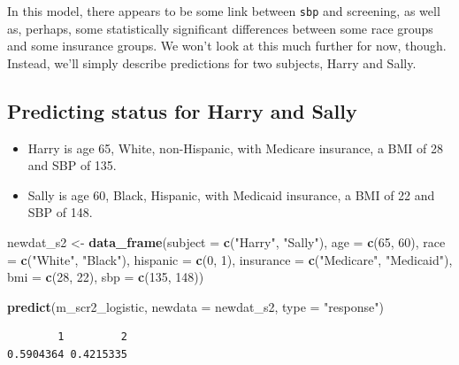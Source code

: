 \documentclass[]{book}
\newenvironment{Shaded}{\begin{snugshade}}{\end{snugshade}}
\newcommand{\KeywordTok}[1]{\textcolor[rgb]{0.13,0.29,0.53}{\textbf{#1}}}
\newcommand{\DataTypeTok}[1]{\textcolor[rgb]{0.13,0.29,0.53}{#1}}
\newcommand{\DecValTok}[1]{\textcolor[rgb]{0.00,0.00,0.81}{#1}}
\newcommand{\StringTok}[1]{\textcolor[rgb]{0.31,0.60,0.02}{#1}}
\newcommand{\NormalTok}[1]{#1}
\providecommand{\tightlist}{%
  \setlength{\itemsep}{0pt}\setlength{\parskip}{0pt}}
\theoremstyle{definition}
\theoremstyle{definition}
\theoremstyle{definition}
\theoremstyle{remark}
\begin{document}
In this model, there appears to be some link between \texttt{sbp} and
screening, as well as, perhaps, some statistically significant
differences between some race groups and some insurance groups. We won't
look at this much further for now, though. Instead, we'll simply
describe predictions for two subjects, Harry and Sally.

\subsection{Predicting status for Harry and
Sally}\label{predicting-status-for-harry-and-sally}

\begin{itemize}
\tightlist
\item
  Harry is age 65, White, non-Hispanic, with Medicare insurance, a BMI
  of 28 and SBP of 135.
\item
  Sally is age 60, Black, Hispanic, with Medicaid insurance, a BMI of 22
  and SBP of 148.
\end{itemize}

\begin{Shaded}
\begin{Highlighting}[]
\NormalTok{newdat_s2 <-}\StringTok{ }\KeywordTok{data_frame}\NormalTok{(}\DataTypeTok{subject =} \KeywordTok{c}\NormalTok{(}\StringTok{"Harry"}\NormalTok{, }\StringTok{"Sally"}\NormalTok{),}
                     \DataTypeTok{age =} \KeywordTok{c}\NormalTok{(}\DecValTok{65}\NormalTok{, }\DecValTok{60}\NormalTok{),}
                     \DataTypeTok{race =} \KeywordTok{c}\NormalTok{(}\StringTok{"White"}\NormalTok{, }\StringTok{"Black"}\NormalTok{),}
                     \DataTypeTok{hispanic =} \KeywordTok{c}\NormalTok{(}\DecValTok{0}\NormalTok{, }\DecValTok{1}\NormalTok{),}
                     \DataTypeTok{insurance =} \KeywordTok{c}\NormalTok{(}\StringTok{"Medicare"}\NormalTok{, }\StringTok{"Medicaid"}\NormalTok{),}
                     \DataTypeTok{bmi =} \KeywordTok{c}\NormalTok{(}\DecValTok{28}\NormalTok{, }\DecValTok{22}\NormalTok{),}
                     \DataTypeTok{sbp =} \KeywordTok{c}\NormalTok{(}\DecValTok{135}\NormalTok{, }\DecValTok{148}\NormalTok{))}

\KeywordTok{predict}\NormalTok{(m_scr2_logistic, }\DataTypeTok{newdata =}\NormalTok{ newdat_s2, }
        \DataTypeTok{type =} \StringTok{"response"}\NormalTok{)}
\end{Highlighting}
\end{Shaded}

\begin{verbatim}
        1         2 
0.5904364 0.4215335 
\end{verbatim}
\end{document}

